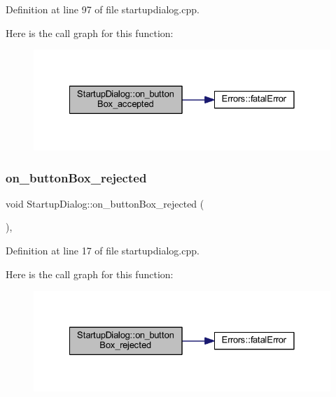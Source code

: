Definition at line 97 of file startupdialog.\+cpp.

Here is the call graph for this function\+:
\nopagebreak
\begin{figure}[H]
\begin{center}
\leavevmode
\includegraphics[width=328pt]{classStartupDialog_acf772dfd42cfc24f058372cb6ee3ae24_cgraph}
\end{center}
\end{figure}
\mbox{\label{classStartupDialog_a7aee3b6219d164760589c51aa7989bad}} 
\subsubsection{\texorpdfstring{on\_buttonBox\_rejected}{on\_buttonBox\_rejected}}
{\footnotesize\ttfamily void Startup\+Dialog\+::on\+\_\+button\+Box\+\_\+rejected (\begin{DoxyParamCaption}{ }\end{DoxyParamCaption})\hspace{0.3cm}{\ttfamily [private]}, {\ttfamily [slot]}}



Definition at line 17 of file startupdialog.\+cpp.

Here is the call graph for this function\+:
\nopagebreak
\begin{figure}[H]
\begin{center}
\leavevmode
\includegraphics[width=328pt]{classStartupDialog_a7aee3b6219d164760589c51aa7989bad_cgraph}
\end{center}
\end{figure}
\mbox{\label{classStartupDialog_a5d6aa20d81bc223b2e9931811b2aca95}} 
